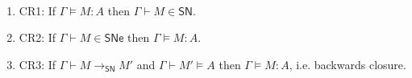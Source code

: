 \documentclass{article}
\newcommand{\SN}{\mathsf{SN}}
\newcommand{\SNe}{\mathsf{SNe}}
\newcommand{\CR}{\textsf{CR}}
\newcommand{\redSN}{\longrightarrow_\SN}
\def\lv{\mathopen{{[\kern-0.14em[}}}    %
\def\rv{\mathclose{{]\kern-0.14em]}}}   %
\newcommand{\den}[1]{\lv #1 \rv}
\begin{document}
\begin{theorem}\label{thm:redcand}~
  \begin{enumerate}
  \item\label{cr1} \CR 1: If $\Gamma \models M : A$ then $\Gamma \vdash M \in \SN$. %
  \item\label{cr2} \CR 2: If $\Gamma \vdash M \in \SNe$ then $\Gamma \models M : A$. %
  \item\label{cr3} \CR 3: If $\Gamma \vdash M \redSN M'$ and $\Gamma \vdash M' \models A$ then $\Gamma \models M : A$, i.e. backwards closure.
  \end{enumerate} 
\end{theorem}
\end{document}
